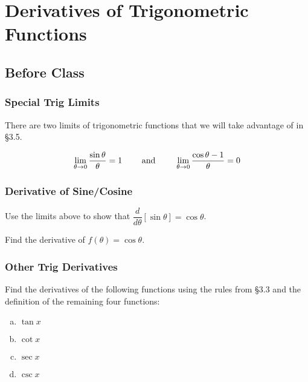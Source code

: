 \documentclass[notes]{subfiles}
\begin{document}
	\setcounter{section}{4}
	\fancyhead[LO,RE]{\bfseries \small \currentname}
	\fancyfoot[C]{{}}
	\fancyfoot[LO,RE]{\large \thepage}	%
	
\section*{Derivatives of Trigonometric Functions}\label{cs35}
	\subsection*{Before Class}
	\subsubsection*{Special Trig Limits}
		There are two limits of trigonometric functions that we will take advantage of in \S3.5.  
		\begin{rmk}
			\[\displaystyle \lim_{\theta\to 0} \dfrac{\sin \theta}{\theta} = 1\qquad\text{ and }\qquad \displaystyle \lim_{\theta\to 0} \dfrac{\cos \theta - 1}{\theta} = 0\]
		\end{rmk}
		\begin{pf}
			
		\end{pf}
			\newpage

	\subsubsection*{Derivative of Sine/Cosine}
		\begin{ex}
			Use the limits above to show that \(\dfrac{d}{d\theta}\left[\sin \theta\right] = \cos \theta\).
		\end{ex}	
	
		\begin{ex}
			Find the derivative of \(f(\theta) = \cos \theta\).
		\end{ex}
			\newpage
			
	\subsubsection*{Other Trig Derivatives}
		\begin{ex}
			Find the derivatives of the following functions using the rules from \S3.3 and the definition of the remaining four functions:
			\begin{enumerate}[(a)]
				\item \(\tan x\)
					
				\item \(\cot x\)
					
				\item \(\sec x\)
					
				\item \(\csc x\)
					
			\end{enumerate}
		\end{ex}
			\newpage
\end{document}
